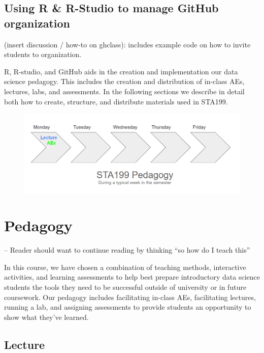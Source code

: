 \documentclass[
  12pt]{article}
\begin{document}
\hypertarget{using-r-r-studio-to-manage-github-organization}{%
\subsection{Using R \& R-Studio to manage GitHub
organization}\label{using-r-r-studio-to-manage-github-organization}}

(insert discussion / how-to on ghclass): includes example code on how to
invite students to organization.

R, R-studio, and GitHub aids in the creation and implementation our data
science pedagogy. This includes the creation and distribution of
in-class AEs, lectures, labs, and assessments. In the following sections
we describe in detail both how to create, structure, and distribute
materials used in STA199.

\begin{figure}

{\centering \includegraphics{images/pedagogy.png}

}

\end{figure}

\hypertarget{sec-ped}{%
\section{Pedagogy}\label{sec-ped}}

-- Reader should want to continue reading by thinking ``so how do I
teach this''

In this course, we have chosen a combination of teaching methods,
interactive activities, and learning assessments to help best prepare
introductory data science students the tools they need to be successful
outside of university or in future coursework. Our pedagogy includes
facilitating in-class AEs, facilitating lectures, running a lab, and
assigning assessments to provide students an opportunity to show what
they've learned.

\hypertarget{lecture}{%
\subsection{Lecture}\label{lecture}}
\end{document}
